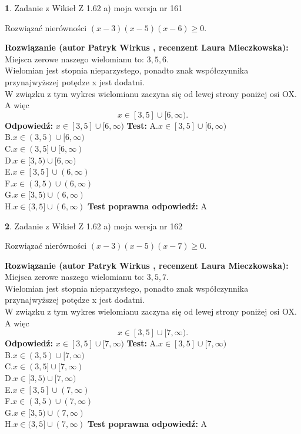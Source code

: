 \documentclass[12pt, a4paper]{article}
\theoremstyle{definition} %
\newtheorem{zad}{}
\newcommand{\zadStart}[1]{\begin{zad}#1\newline}
\newcommand{\zadStop}{\end{zad}}
\newcommand{\rozwStart}[2]{\noindent \textbf{Rozwiązanie (autor #1 , recenzent #2): }\newline}
\newcommand{\rozwStop}{\newline}
\newcommand{\odpStart}{\noindent \textbf{Odpowiedź:}\newline}
\newcommand{\odpStop}{\newline}
\newcommand{\testStart}{\noindent \textbf{Test:}\newline}
\newcommand{\testStop}{\newline}
\newcommand{\kluczStart}{\noindent \textbf{Test poprawna odpowiedź:}\newline}
\newcommand{\kluczStop}{\newline}
\begin{document}
\zadStart{Zadanie z Wikieł Z 1.62 a) moja wersja nr 161}

Rozwiązać nierówności $(x-3)(x-5)(x-6)\ge0$.
\zadStop
\rozwStart{Patryk Wirkus}{Laura Mieczkowska}
Miejsca zerowe naszego wielomianu to: $3, 5, 6$.\\
Wielomian jest stopnia nieparzystego, ponadto znak współczynnika przy\linebreak najwyższej potędze x jest dodatni.\\ W związku z tym wykres wielomianu zaczyna się od lewej strony poniżej osi OX. A więc $$x \in [3,5] \cup [6,\infty).$$
\rozwStop
\odpStart
$x \in [3,5] \cup [6,\infty)$
\odpStop
\testStart
A.$x \in [3,5] \cup [6,\infty)$\\
B.$x \in (3,5) \cup [6,\infty)$\\
C.$x \in (3,5] \cup [6,\infty)$\\
D.$x \in [3,5) \cup [6,\infty)$\\
E.$x \in [3,5] \cup (6,\infty)$\\
F.$x \in (3,5) \cup (6,\infty)$\\
G.$x \in [3,5) \cup (6,\infty)$\\
H.$x \in (3,5] \cup (6,\infty)$
\testStop
\kluczStart
A
\kluczStop



\zadStart{Zadanie z Wikieł Z 1.62 a) moja wersja nr 162}

Rozwiązać nierówności $(x-3)(x-5)(x-7)\ge0$.
\zadStop
\rozwStart{Patryk Wirkus}{Laura Mieczkowska}
Miejsca zerowe naszego wielomianu to: $3, 5, 7$.\\
Wielomian jest stopnia nieparzystego, ponadto znak współczynnika przy\linebreak najwyższej potędze x jest dodatni.\\ W związku z tym wykres wielomianu zaczyna się od lewej strony poniżej osi OX. A więc $$x \in [3,5] \cup [7,\infty).$$
\rozwStop
\odpStart
$x \in [3,5] \cup [7,\infty)$
\odpStop
\testStart
A.$x \in [3,5] \cup [7,\infty)$\\
B.$x \in (3,5) \cup [7,\infty)$\\
C.$x \in (3,5] \cup [7,\infty)$\\
D.$x \in [3,5) \cup [7,\infty)$\\
E.$x \in [3,5] \cup (7,\infty)$\\
F.$x \in (3,5) \cup (7,\infty)$\\
G.$x \in [3,5) \cup (7,\infty)$\\
H.$x \in (3,5] \cup (7,\infty)$
\testStop
\kluczStart
A
\kluczStop
\end{document}
